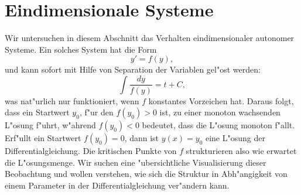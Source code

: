 \section{Eindimensionale Systeme}
Wir untersuchen in diesem Abschnitt das Verhalten eindimensionaler autonomer
Systeme.
Ein solches System hat die Form
\[
y'=f(y),
\]
und kann sofort mit Hilfe von Separation der Variablen gel"ost werden:
\[
\int\frac{dy}{f(y)} = t+C,
\]
was nat"urlich nur funktioniert, wenn $f$ konstantes Vorzeichen hat.
Daraus folgt, dass ein Startwert $y_0$, f"ur den $f(y_0)>0$ ist,
zu einer monoton wachsenden L"osung f"uhrt, w"ahrend $f(y_0)<0$
bedeutet, dass die L"osung monoton f"allt.
Erf"ullt ein Startwert $f(y_0)=0$, dann ist $y(x)=y_0$ eine
L"osung der Differentialgleichung.
Die kritischen Punkte von $f$ strukturieren also wie erwartet die
L"osungsmenge.
Wir suchen eine "ubersichtliche Visualisierung dieser Beobachtung
und wollen verstehen, wie sich die Struktur in Abh"angigkeit
von einem Parameter in der Differentialgleichung ver"andern kann.

%
%
